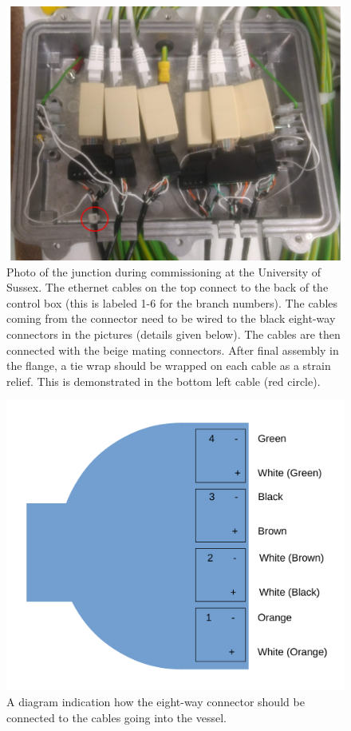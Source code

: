 \begin{figure}
\begin{center}	
  \includegraphics[width=0.75\linewidth]{figures/junction_box.jpg}
  \caption{Photo of the junction during commissioning at the University of Sussex. The ethernet cables on the top connect to the back of the control box (this is labeled 1-6 for the branch numbers). The cables coming from the connector need to be wired to the black eight-way connectors in the pictures (details given below). The cables are then connected with the beige mating connectors. After final assembly in the flange, a tie wrap should be wrapped on each cable as a strain relief. This is demonstrated in the bottom left cable (red circle). }
  \label{figure:junction_box}
\end{center}
\end{figure}



\begin{figure}
\begin{center}	
  \includegraphics[width=0.5\linewidth]{figures/connector.pdf}
  \caption{A diagram indication how the eight-way connector should be connected to the cables going into the vessel.}
  \label{figure:connector}
\end{center}
\end{figure}


